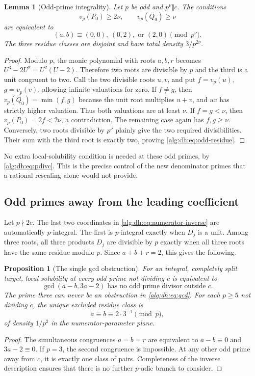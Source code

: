 \documentclass[11pt]{article}
\numberwithin{equation}{section}
\theoremstyle{plain}
\newtheorem{proposition}[proposition]{Proposition}
\theoremstyle{plain}
\newtheorem{lemma}[lemma]{Lemma}
\theoremstyle{plain}
\theoremstyle{definition}
\theoremstyle{definition}
\theoremstyle{definition}
\theoremstyle{remark}
\begin{document}
\begin{lemma}[Odd-prime integrality]\label{alg:dh:lem:odd-integrality}
Let $p$ be odd and $p^\nu\Vert c$. The conditions
\[
 v_p(P_0)\ge2\nu,\qquad v_p(Q_0)\ge\nu
\]
are equivalent to
\begin{equation}\label{alg:dh:eq:odd-residue}
 (a,b)\equiv(0,0),\ (0,2),\text{ or }(2,0)\pmod{p^\nu}.
\end{equation}
The three residue classes are disjoint and have total density
$3/p^{2\nu}$.
\end{lemma}
\begin{proof}
Modulo $p$, the monic polynomial with roots $a,b,r$ becomes
$U^3-2U^2=U^2(U-2)$. Therefore two roots are divisible by $p$ and the
third is a unit congruent to two. Call the two divisible roots $u,v$,
and put $f=v_p(u)$, $g=v_p(v)$, allowing infinite valuations for zero.
If $f\ne g$, then $v_p(Q_0)=\min(f,g)$ because the unit root multiplies
$u+v$, and $uv$ has strictly higher valuation. Thus both valuations are
at least $\nu$. If $f=g<\nu$, then $v_p(P_0)=2f<2\nu$, a contradiction.
The remaining case again has $f,g\ge\nu$. Conversely, two roots divisible
by $p^\nu$ plainly give the two required divisibilities. Their sum with
the third root is exactly two, proving \eqref{alg:dh:eq:odd-residue}.
\end{proof}
No extra local-solubility condition is needed at these odd primes,
by \eqref{alg:dh:eq:pdivc}. This is the precise control of the new denominator
primes that a rational rescaling alone would not provide.

\subsection{Odd primes away from the leading coefficient}
Let $p\nmid 2c$. The last two coordinates in
\eqref{alg:dh:eq:numerator-inverse} are automatically $p$-integral. The first is
$p$-integral exactly when $D_j$ is a unit. Among three roots, all three
products $D_j$ are divisible by $p$ exactly when all three roots have the
same residue modulo $p$. Since $a+b+r=2$, this gives the following.

\begin{proposition}[The single gcd obstruction]\label{alg:dh:prop:gcd}
For an integral, completely split target, local solubility at every odd
prime not dividing $c$ is equivalent to
\begin{equation}\label{alg:dh:eq:gcd}
 \gcd(a-b,3a-2)\text{ has no odd prime divisor outside }c.
\end{equation}
The prime three can never be an obstruction in \eqref{alg:dh:eq:gcd}.
For each $p\ge5$ not dividing $c$, the unique excluded residue class is
\[
 a\equiv b\equiv 2\cdot3^{-1}\pmod p,
\]
of density $1/p^2$ in the numerator-parameter plane.
\end{proposition}
\begin{proof}
The simultaneous congruences $a=b=r$ are equivalent to
$a-b\equiv0$ and $3a-2\equiv0$. If $p=3$, the second congruence is
impossible. At any other odd prime away from $c$, it is exactly one
class of pairs. Completeness of the inverse description ensures that
there is no further $p$-adic branch to consider.
\end{proof}
\end{document}
